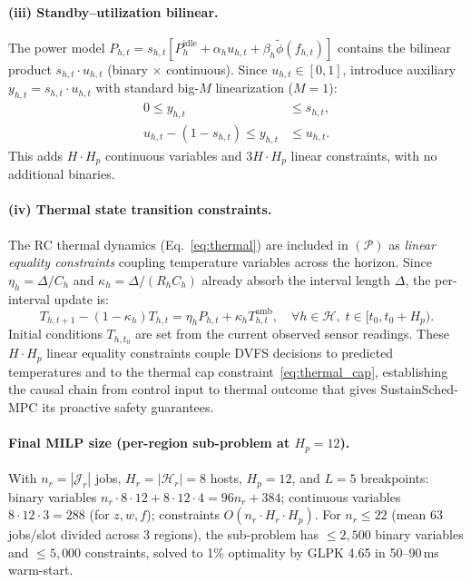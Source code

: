 \documentclass[a4paper,fleqn]{cas-dc}
\begin{document}
\paragraph{(iii) Standby--utilization bilinear.}
The power model $P_{h,t} = s_{h,t}[P^{\mathrm{idle}}_h + \alpha_h u_{h,t} + \beta_h \tilde{\phi}(f_{h,t})]$ contains the bilinear product $s_{h,t} \cdot u_{h,t}$ (binary $\times$ continuous). Since $u_{h,t} \in [0,1]$, introduce auxiliary $y_{h,t} = s_{h,t} \cdot u_{h,t}$ with standard big-$M$ linearization ($M = 1$):
\begin{align}
0 \leq y_{h,t} &\leq s_{h,t}, \\
u_{h,t} - (1-s_{h,t}) \leq y_{h,t} &\leq u_{h,t}.
\end{align}
This adds $H \cdot H_p$ continuous variables and $3H \cdot H_p$ linear constraints, with no additional binaries.

\paragraph{(iv) Thermal state transition constraints.}
The RC thermal dynamics (Eq.~\eqref{eq:thermal}) are included in $(\mathcal{P})$ as \emph{linear equality constraints} coupling temperature variables across the horizon. Since $\eta_h = \Delta/C_h$ and $\kappa_h = \Delta/(R_hC_h)$ already absorb the interval length $\Delta$, the per-interval update is:
\begin{equation}
T_{h,t+1} - (1-\kappa_h)T_{h,t} = \eta_h P_{h,t} + \kappa_h T^{\mathrm{amb}}_{h,t}, \quad \forall h \in \mathcal{H},\; t \in [t_0, t_0+H_p).
\end{equation}
Initial conditions $T_{h,t_0}$ are set from the current observed sensor readings. These $H \cdot H_p$ linear equality constraints couple DVFS decisions to predicted temperatures and to the thermal cap constraint~\eqref{eq:thermal_cap}, establishing the causal chain from control input to thermal outcome that gives SustainSched-MPC its proactive safety guarantees.

\paragraph{Final MILP size (per-region sub-problem at $H_p=12$).}
With $n_r = |\mathcal{J}_r|$ jobs, $H_r = |\mathcal{H}_r| = 8$ hosts, $H_p = 12$, and $L = 5$ breakpoints: binary variables $n_r \cdot 8 \cdot 12 + 8 \cdot 12 \cdot 4 = 96 n_r + 384$; continuous variables $8 \cdot 12 \cdot 3 = 288$ (for $z, w, f$); constraints $O(n_r \cdot H_r \cdot H_p)$. For $n_r \leq 22$ (mean 63 jobs/slot divided across 3 regions), the sub-problem has $\leq 2{,}500$ binary variables and $\leq 5{,}000$ constraints, solved to 1\% optimality by GLPK 4.65 in 50--90\,ms warm-start.
\end{document}
